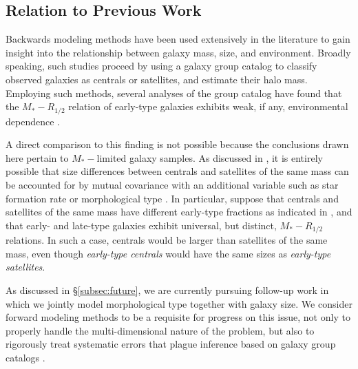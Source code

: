 \documentclass[usenatbib,usegraphicx,letterpaper]{mn2e}
\newcommand{\rhalf}{R_{1/2}}
\newcommand{\mstar}{M_{\ast}}
\begin{document}
\subsection{Relation to Previous Work}
\label{subsec:previous_work}

Backwards modeling methods have been used extensively in the literature to gain insight into the relationship between galaxy mass, size, and environment. Broadly speaking, such studies proceed by using a galaxy group catalog to classify observed galaxies as centrals or satellites, and estimate their halo mass.  Employing such methods, several analyses of the \citet{yang_etal05b} group catalog have found that the $\mstar-\rhalf$ relation of early-type galaxies exhibits weak, if any, environmental dependence \citep{huertas_company_etal13b,shankar_etal14}. 

A direct comparison to this finding is not possible because the conclusions drawn here pertain to $\mstar-$limited galaxy samples. As discussed in \citet{spindler_wake17}, it is entirely possible that size differences between centrals and satellites of the same mass can be accounted for by mutual covariance with an additional variable such as star formation rate or morphological type \citep[see also][for an explicit demonstration of this scenario]{lilly_carollo16}. In particular, suppose that centrals and satellites of the same mass have different early-type fractions as indicated in \citet{weinmann_etal06}, and that early- and late-type galaxies exhibit universal, but distinct, $\mstar-\rhalf$ relations. In such a case, centrals would be larger than satellites of the same mass, even though {\em early-type centrals} would have the same sizes as {\em early-type satellites}. 

As discussed in \S\ref{subsec:future}, we are currently pursuing follow-up work in which we jointly model morphological type together with galaxy size. We consider forward modeling methods to be a requisite for progress on this issue, not only to properly handle the multi-dimensional nature of the problem, but also to rigorously treat systematic errors that plague inference based on galaxy group catalogs \citep[see][for a thorough discussion]{campbell_etal15}. 
\end{document}
